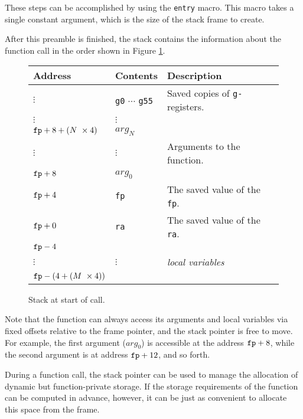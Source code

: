 These steps can be accomplished by using the {\tt entry} macro.  This
macro takes a single constant argument, which is the size of the stack
frame to create.

After this preamble is finished, the stack contains the information
about the function call in the order shown in Figure
\ref{simple-stack-call}.

\begin{figure}
\caption{\label{simple-stack-call} Stack at start of call.}

\begin{center}

\begin{tabular}{|l|l|l|}
\hline
{\bf Address}	& {\bf Contents} & {\bf Description} \\
\hline
$\vdots$	& {\tt g0} $\cdots$ {\tt g55}	&
		Saved copies of {\tt g-}registers. \\
$\vdots$	& $\vdots$			& \\
\hline
${\tt fp} + 8 + (N ~ \times 4 )$ 	& $arg_{N}$	& \\
$\vdots$	& $\vdots$			& 
		Arguments to the function. \\
${\tt fp} + 8$	& $arg_{0}$		& \\

\hline
${\tt fp} + 4$	& {\tt fp}			&
		The saved value of the {\tt fp}. \\
\hline
${\tt fp} + 0$	& {\tt ra}			&
		The saved value of the {\tt ra}. \\
\hline
${\tt fp} - 4$	& 				& \\
$\vdots$	& $\vdots$			&
		{\em local variables}		\\
${\tt fp} - (4 + (M ~ \times 4))$	&	& \\
\hline
\end{tabular}

\end{center}

\end{figure}

Note that the function can always access its arguments and local
variables via fixed offsets relative to the frame pointer, and the
stack pointer is free to move.  For example, the first argument
($arg_{0}$) is accessible at the address ${\tt fp} + 8$, while the
second argument is at address ${\tt fp} + 12$, and so forth.

During a function call, the stack pointer can be used to manage the
allocation of dynamic but function-private storage.  If the storage
requirements of the function can be computed in advance, however, it
can be just as convenient to allocate this space from the frame.

